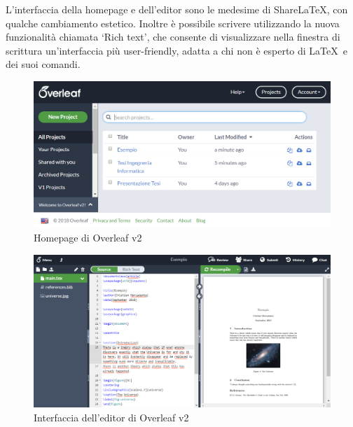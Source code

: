 L'interfaccia della homepage e dell'editor sono le medesime di ShareLaTeX, con qualche cambiamento estetico. Inoltre è possibile scrivere utilizzando la nuova funzionalità chiamata \enquote*{Rich text}, che consente di visualizzare nella finestra di scrittura un'interfaccia più user-friendly, adatta a chi non è esperto di \LaTeX ~e dei suoi comandi.
\begin{figure}[h]
    \centering
    \includegraphics[width=\textwidth]{immagini/overleaf_homepage.PNG}
    \caption{Homepage di Overleaf v2}
    \label{fig:overleaf_homepage}
\end{figure}
\begin{figure}[h]
    \centering
    \includegraphics[width=\textwidth]{immagini/overleaf_editor.PNG}
    \caption{Interfaccia dell'editor di Overleaf v2}
    \label{fig:overleaf_editor}
\end{figure}

